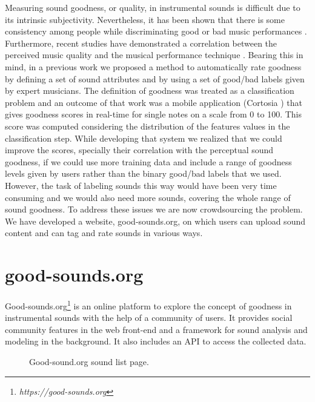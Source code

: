 \documentclass{article}
\begin{document}
Measuring sound goodness, or quality, in instrumental sounds is difficult due to its intrinsic subjectivity. Ne\-ver\-theless, it has been shown that there is some consistency among people while discriminating good or bad music performances \cite{1}. Furthermore, recent studies have demonstrated a correlation between the perceived music quality and the musical performance technique \cite{2}. Bearing this in mind, in a previous work \cite{01} we proposed a method to automatically rate goodness by defining a set of sound attributes and by using a set of good/bad labels given by expert musicians. The definition of goodness was treated as a classification problem and an outcome of that work was a mobile application (Cortosia \textregistered) that gives goodness scores in real-time for single notes on a scale from 0 to 100. This score was computed considering the distribution of the features values in the classification step. While developing that system we realized that we could improve the scores, specially their correlation with the perceptual sound goodness, if we could use more training data and include a range of goodness levels given by users rather than the binary good/bad labels that we used. However, the task of labeling sounds this way would have been very time consuming and we would  also need more sounds, covering the whole range of sound goodness. To address these issues we are now crowdsourcing the problem. We have developed a website, good-sounds.org, on which users can upload sound content and can tag and rate sounds in various ways.      
%
\section{good-sounds.org}\label{sec:goodsounds}
Good-sounds.org\footnote{\textit{https://good-sounds.org}} is an online platform to explore the concept of goodness in instrumental sounds with the help of a community of users. It provides social community features in the web front-end and a framework for sound analysis and modeling in the background. It also includes an API to access the collected data.

\begin{figure}[ht]
 \centerline{}
 \caption{Good-sound.org sound list page.}
 \label{fig:sound_list}
\end{figure}
\end{document}
